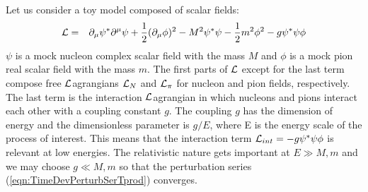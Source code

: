 Let us consider a toy model composed of scalar fields:
\begin{eqnarray}
{\cal L} 
&=&
\partial_\mu \psi^* \partial^\mu \psi
+
\frac{1}{2} (\partial_\mu \phi)^2 
-
M^2 \psi^*  \psi
-
\frac{1}{2} m^2 \phi^2
-
g \psi^*  \psi \phi
\label{eqn:sclYkwLagDens}
\end{eqnarray}
$\psi$ is a mock nucleon complex scalar field with the mass $M$ 
and $\phi$ is a mock pion real scalar field with the mass $m$.
The first parts of $\cal L$ except for the last term compose free $\cal L$agrangians
${\cal L}_N$ and ${\cal L}_\pi$ for nucleon and pion fields, respectively.
The last term is the interaction $\cal L$agrangian in which
nucleons and pions interact each other with a coupling constant $g$.
The coupling $g$ has the dimension of energy and the dimensionless
parameter is $g / E$, where E is the energy scale of the process of interest.
This means that the interaction term ${\cal L}_{int} = - g \psi^* \psi \phi$ is
relevant at low energies. The relativistic nature gets important at $E \gg M, m$
and we may choose $g \ll M, m$ so that the perturbation series (\ref{eqn:TimeDevPerturbSerTprod})
converges.

